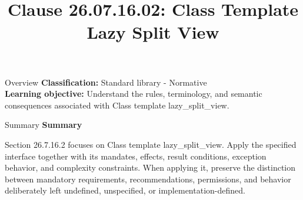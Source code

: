 \documentclass[10pt,letterpaper]{article}
\title{Clause 26.07.16.02: Class Template Lazy Split View}
\author{}
\date{}
\begin{document}
\maketitle
\begin{CornellOverviewBox}{Overview}
\textbf{Classification:} Standard library - Normative\\[2pt]
\textbf{Learning objective:} Understand the rules, terminology, and semantic consequences associated with Class template lazy\_split\_view.
\end{CornellOverviewBox}\begin{CornellSummaryBox}{Summary}
{\sffamily\bfseries\color{Accent} Summary}\par\vspace{3pt}Section 26.7.16.2 focuses on Class template lazy\_split\_view. Apply the specified interface together with its mandates, effects, result conditions, exception behavior, and complexity constraints. When applying it, preserve the distinction between mandatory requirements, recommendations, permissions, and behavior deliberately left undefined, unspecified, or implementation-defined.
\end{CornellSummaryBox}
\end{document}
